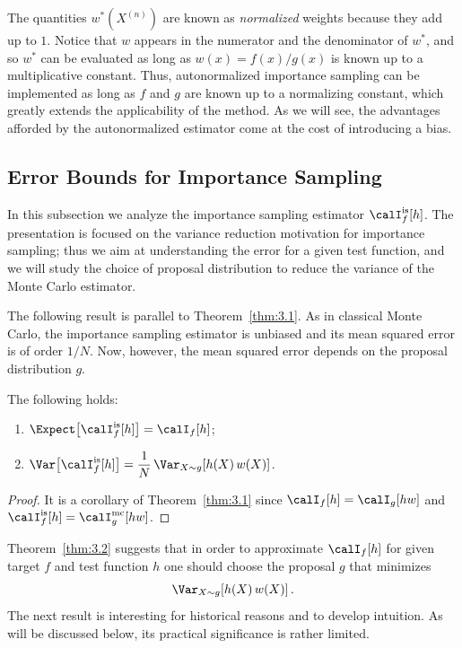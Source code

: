 The quantities $w^*(X^{(n)})$ are known as \emph{normalized} weights because
they add up to $1$. Notice that $w$ appears in the numerator and the denominator
of $w^*$, and so $w^*$ can be evaluated as long as $w(x) = f(x)/g(x)$ is known
up to a multiplicative constant. Thus, autonormalized importance sampling can be
implemented as long as $f$ and $g$ are known up to a normalizing constant, which
greatly extends the applicability of the method. As we will see, the advantages
afforded by the autonormalized estimator come at the cost of introducing a bias.

\subsection{Error Bounds for Importance Sampling}
\label{sec:3.2.1}

In this subsection we analyze the importance sampling estimator
$\calI_f^{\mathrm{is}}[h]$. The presentation is focused on the variance
reduction motivation for importance sampling; thus we aim at understanding the
error for a given test function, and we will study the choice of proposal
distribution to reduce the variance of the Monte Carlo estimator.

The following result is parallel to Theorem~\ref{thm:3.1}. As in classical
Monte Carlo, the importance sampling estimator is unbiased and its mean squared
error is of order $1/N$. Now, however, the mean squared error depends on the
proposal distribution $g$.

\begin{theorem}
\label{thm:3.2}
The following holds:
\begin{enumerate}
  \item $\Expect\!\left[\calI_f^{\mathrm{is}}[h]\right] = \calI_f[h]$;
  \item $\Var\!\left[\calI_f^{\mathrm{is}}[h]\right]
         = \dfrac{1}{N}\,\Var_{X \sim g}\!\left[h(X)\,w(X)\right]$.
\end{enumerate}
\end{theorem}

\begin{proof}
It is a corollary of Theorem~\ref{thm:3.1} since $\calI_f[h] = \calI_g[hw]$
and $\calI_f^{\mathrm{is}}[h] = \calI_g^{\mathrm{mc}}[hw]$.
\end{proof}

Theorem~\ref{thm:3.2} suggests that in order to approximate $\calI_f[h]$ for
given target $f$ and test function $h$ one should choose the proposal $g$ that
minimizes
\[
  \Var_{X \sim g}\!\left[h(X)\,w(X)\right].
\]
The next result is interesting for historical reasons and to develop intuition.
As will be discussed below, its practical significance is rather limited.

